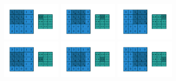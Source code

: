 \begin{figure}
     \centering
     \begin{subfigure}[b]{0.6\textwidth}
        \centering
        \includegraphics[width=0.32\textwidth]{chapters/assets/2d-conv-example/numerical_no_padding_no_strides_00.pdf}
        \includegraphics[width=0.32\textwidth]{chapters/assets/2d-conv-example/numerical_no_padding_no_strides_01.pdf}
        \includegraphics[width=0.32\textwidth]{chapters/assets/2d-conv-example/numerical_no_padding_no_strides_02.pdf}
        \includegraphics[width=0.32\textwidth]{chapters/assets/2d-conv-example/numerical_no_padding_no_strides_03.pdf}
        \includegraphics[width=0.32\textwidth]{chapters/assets/2d-conv-example/numerical_no_padding_no_strides_04.pdf}
        \includegraphics[width=0.32\textwidth]{chapters/assets/2d-conv-example/numerical_no_padding_no_strides_05.pdf}

\end{subfigure}
\end{figure}
